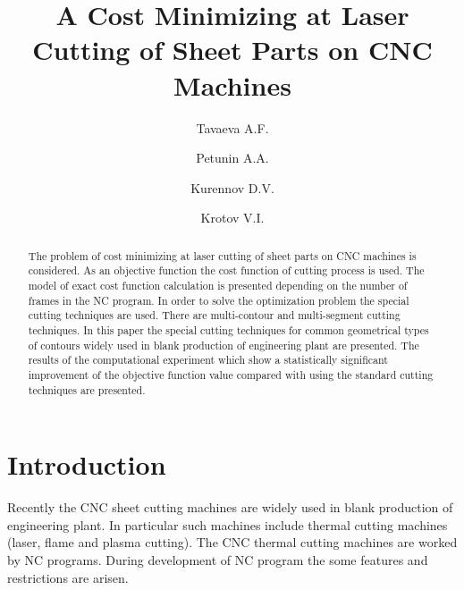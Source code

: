 \documentclass[runningheads]{llncs}
\begin{document}
\title{A Cost Minimizing at Laser Cutting of Sheet Parts on CNC Machines}

\author{
  Tavaeva A.F. 
  \and
  Petunin A.A. 
  \and
  Kurennov D.V. 
  \and Krotov V.I. 
}

\maketitle              %

\begin{abstract}
The problem of cost minimizing at laser cutting of sheet parts on CNC machines is considered.
As an objective function the cost function of cutting process is used.
The model of exact cost function calculation is presented
depending on the number of frames in the NC program.
In order to solve the optimization problem the special cutting techniques are used.
There are multi-contour and multi-segment cutting techniques.
In this paper the special cutting techniques for common geometrical types of
contours widely used in blank production of engineering plant are presented.
The results of the computational experiment
which show a statistically significant improvement
of the objective function value compared
with using the standard cutting techniques are presented.

\end{abstract}

\section{Introduction}

Recently the CNC sheet cutting machines are widely used in blank production of engineering plant.
In particular such machines include thermal cutting machines (laser, flame and plasma cutting).
The CNC thermal cutting machines are worked by NC programs.
During development of NC program the some features and restrictions are arisen.
\end{document}
